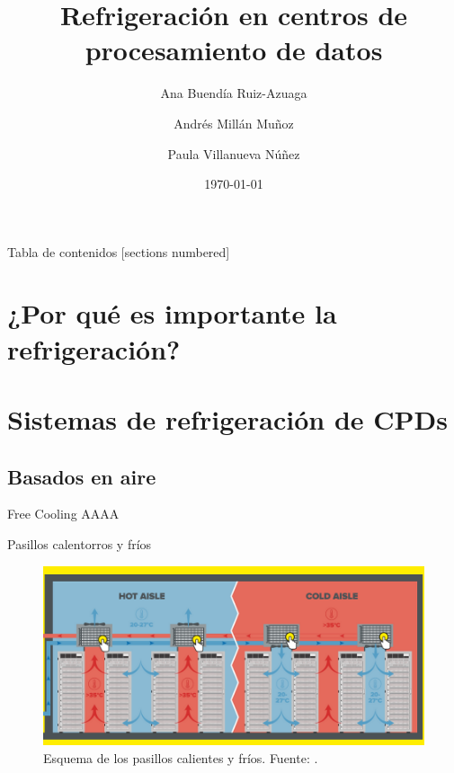 \documentclass[aspectratio=169, compress]{beamer}
\title{Refrigeración en centros de procesamiento de datos}
\date{\today}
\author{Ana Buendía Ruiz-Azuaga \and Andrés Millán Muñoz \and Paula Villanueva Núñez}
\institute{Universidad de Granada}
\begin{document}
\maketitle

\begin{frame}{Tabla de contenidos}
    [sections numbered]
    \tableofcontents
\end{frame}

\section{¿Por qué es importante la refrigeración?}    %




\section{Sistemas de refrigeración de CPDs}



\subsection{Basados en aire}

\begin{frame}{Free Cooling}
    AAAA
\end{frame}

\begin{frame}{Pasillos calentorros y fríos}
    \begin{figure}
        \begin{center}
            \includegraphics[scale=0.7]{../figures/pasillos}
            \caption{Esquema de los pasillos calientes y fríos. Fuente: \cite{Kelvion}.}
            \label{pasillos}
        \end{center}
    \end{figure}
\end{frame}
\end{document}
